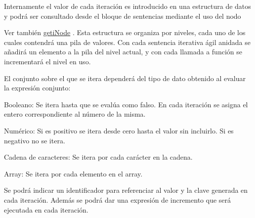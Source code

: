 Internamente el valor de cada iteración es introducido en una estructura de datos y podrá ser consultado desde el bloque de sentencias mediante el uso del nodo \begin{DoxySeeAlso}{Ver también}
\hyperlink{classgetiNode}{geti\-Node} . Esta estructura se organiza por niveles, cada uno de los cuales contendrá una pila de valores. Con cada sentencia iterativa ágil anidada se añadirá un elemento a la pila del nivel actual, y con cada llamada a función se incrementará el nivel en uso.
\end{DoxySeeAlso}
El conjunto sobre el que se itera dependerá del tipo de dato obtenido al evaluar la expresión conjunto\-:
\begin{DoxyItemize}
\item Booleano\-: Se itera hasta que se evalúa como falso. En cada iteración se asigna el entero correspondiente al número de la misma.
\item Numérico\-: Si es positivo se itera desde cero hasta el valor sin incluirlo. Si es negativo no se itera.
\item Cadena de caracteres\-: Se itera por cada carácter en la cadena.
\item Array\-: Se itera por cada elemento en el array.
\end{DoxyItemize}

Se podrá indicar un identificador para referenciar al valor y la clave generada en cada iteración. Además se podrá dar una expresión de incremento que será ejecutada en cada iteración. 

